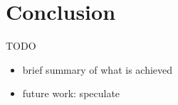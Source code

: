 \chapter{Conclusion}
\label{chap:conclusion}

TODO

\begin{itemize}
\item brief summary of what is achieved
\item future work: speculate
\end{itemize}